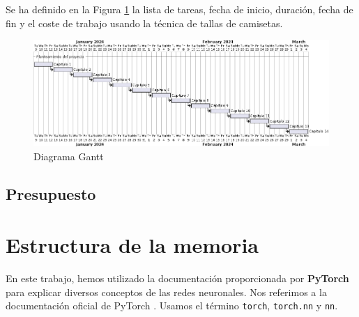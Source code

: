 Se ha definido en la Figura \ref{fig:gantt} la lista de tareas, fecha de inicio, duración, fecha de fin y el coste de trabajo usando la técnica de tallas de camisetas.


\begin{figure}[H]
    \centering
    \includegraphics[width=1\linewidth]{figures/chapter01/Gantt.png}
    \caption{Diagrama Gantt}
    \label{fig:gantt}
\end{figure}

\subsection{Presupuesto}



\section{Estructura de la memoria}

En este trabajo, hemos utilizado la documentación proporcionada por \textbf{PyTorch} para explicar diversos conceptos de las redes neuronales. Nos referimos a la documentación oficial de PyTorch \cite{pytorch2024github}. Usamos el término \texttt{torch}, \texttt{torch.nn} y \texttt{nn}.

